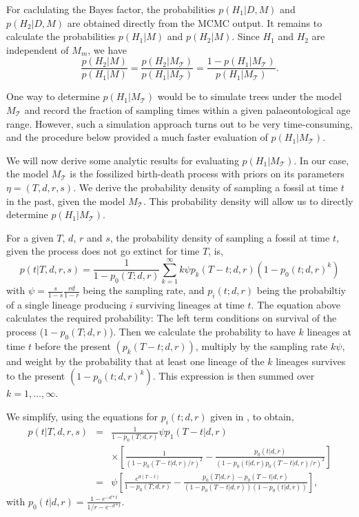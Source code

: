 \documentclass[11pt]{article}
\begin{document}
For caclulating the Bayes factor, the probabilities $p(H_1|D,M)$ and $p(H_2|D,M)$ are obtained directly from the MCMC output.
It remains to calculate the probabilities $p(H_1|M)$ and $p(H_2|M)$.
Since $H_1$ and $H_2$ are independent of $M_m$, we have $$\frac{p(H_2|M)}{p(H_1|M)}=\frac{p(H_2|M_\mathcal{T})}{p(H_1|M_\mathcal{T})}=\frac{1-p(H_1|M_\mathcal{T})}{p(H_1|M_\mathcal{T})}.$$

One way to determine $p(H_1|M_\mathcal{T})$ would be to simulate trees under the model $M_\mathcal{T}$ and record the fraction of sampling times  within a given palaeontological age range. However, such a simulation approach turns out to be very time-consuming, and the procedure below provided a much faster evaluation of $p(H_1|M_\mathcal{T})$.

We  will now derive some analytic results for evaluating $p(H_1|M_\mathcal{T})$. In our case, the model $M_\mathcal{T}$ is the fossilized birth-death process with priors on its parameters $\eta=(T,d,r,s)$. 
We derive the probability density of sampling a fossil at time $t$ in the past, given the model $M_\mathcal{T}$. This probability density will allow us to directly determine $p(H_1|M_\mathcal{T})$.

For a given $T$, $d$, $r$ and $s$, the probability density of sampling a fossil at time $t$, given the process does not go extinct for time $T$, is,
$$p(t|T,d,r,s) = \frac{1}{1-p_0(T;d,r)} \sum_{k=1}^\infty k \psi p_k(T-t;d,r) (1-p_0(t;d,r)^k)$$
with $\psi=\frac{s}{1-s} \frac{rd}{1-r}$ being the sampling rate, and $p_i(t;d,r)$ being the probabiltiy of a single lineage producing $i$ surviving lineages at time $t$.
The equation above calculates the required probability: The left term conditions on survival of the process ($1-p_0(T;d,r)$). Then we calculate the probability to have $k$ lineages at time $t$ before the present $( p_k(T-t;d,r))$, multiply by the sampling rate $k \psi$, and weight by the probability that at least one lineage of the $k$ lineages survives to the present $ (1-p_0(t;d,r)^k)$. This expression is then summed over $k=1,\ldots, \infty$.

We simplify, using the equations for $p_i(t;d,r)$ given in \cite{kendall1948}, to obtain,
\begin{eqnarray*}
p(t|T,d,r,s) &=& \frac{1}{1-p_0(T;d,r)}  \psi p_1(T-t|d,r) \\ & & \times \left[  \frac{1}{(1-p_0(T-t|d,r)/r)^2} - \frac{p_0(t|d,r)}{(1-p_0(t|d,r) p_0(T-t|d,r)/r)^2}  \right]\\
&=&  \psi  \left[ \frac{e^{d(T-t)}}{1-p_0(T;d,r)} - \frac{p_0(T|d,r)-p_0(T-t|d,r)}{(1-p_0(T-t|d,r))(1-p_0(t|d,r))} \right],
\end{eqnarray*}
with $p_0(t|d,r) = \frac{1-e^{-d*t}}{1/r - e^{-d*t}}$.
\end{document}
